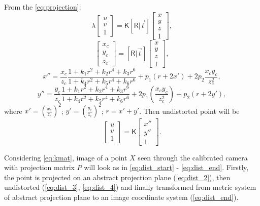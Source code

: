 From the \autoref{eq:projection}:
\begin{equation}
    \label{eq:dist_start}
    \lambda \begin{bmatrix} 
        u \\ v \\ 1 \end{bmatrix} = \pmb{\mathsf{K}} [\pmb{\mathsf{R}} | \vec{t}] \begin{bmatrix} x \\ y \\ z \\ 1
    \end{bmatrix},
\end{equation}
\begin{equation}
    \label{eq:dist_2}
    \begin{bmatrix} x_c \\ y_c \\ z_c \end{bmatrix}
     = [\pmb{\mathsf{R}} | \vec{t}] \begin{bmatrix} x \\ y \\ z \\ 1
    \end{bmatrix},
\end{equation}
\begin{equation}
    \label{eq:dist_3}
    x'' = \frac{x_c}{z_c} \frac{1 + k_1r^2 + k_2r^4 + k_3r^6}{1 + k_4r^2 + k_5r^4 + k_6r^6} + p_1(r + 2x') + 2p_2\frac{x_c y_c}{z^2_c},
\end{equation}
\begin{equation}
    \label{eq:dist_4}
    y'' = \frac{y_c}{z_c} \frac{1 + k_1r^2 + k_2r^4 + k_3r^6}{1 + k_4r^2 + k_5r^4 + k_6r^6} + 2p_1(\frac{x_c y_c}{z_c^2}) + p_2(r + 2y'),
\end{equation}
where $x' = (\frac{x_c}{z_c})^2$; $y' = (\frac{y_c}{z_c})^2$; $r = x' + y'$. Then undistorted point will be
\begin{equation}
    \label{eq:dist_end}
    \begin{bmatrix} u \\ v \\ 1 \end{bmatrix} = \pmb{\mathsf{K}} \begin{bmatrix} x'' \\ y'' \\ 1 \end{bmatrix}.
\end{equation}

Considering \autoref{eq:kmat}, image of a point $X$ seen through the calibrated camera with projection matrix $P$ will look as in \autoref{eq:dist_start} - \autoref{eq:dist_end}. Firstly, the point is projected on an abstract projection plane (\autoref{eq:dist_2}), then undistorted (\autoref{eq:dist_3}, \autoref{eq:dist_4}) and finally transformed from metric system of abstract projection plane to an image coordinate system (\autoref{eq:dist_end}).

